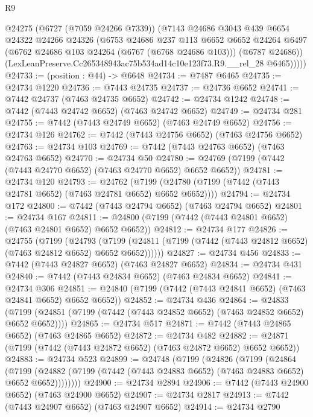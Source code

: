 \begin{lexlean}{R9}
\begin{coremodule}
          @24275
          (@6727 (@7059 @24266 @7339))
          (@7143
            @24686
            @3043
            @439
            @6654
            @24322
            @24266
            @24326
            (@6753
              @24686
              @237
              @113
              @6652
              @6652
              @24264
              @6497
              (@6762 @24686 @103 @24264 (@6767 (@6768 @24686 @103)))
              (@6787 @24686))
            (LexLeanPreserve.Cc265348943ac75b534ad14c10e123f73.R9.__rel_28 @6465)))))
@24733 := (position : @44) -> @6648
@24734 := @7487 @6465
@24735 := @24734 @1220
@24736 := @7443 @24735
@24737 := @24736 @6652
@24741 := @7442 @24737 (@7463 @24735 @6652)
@24742 := @24734 @1242
@24748 := @7442 (@7443 @24742 @6652) (@7463 @24742 @6652)
@24749 := @24734 @281
@24755 := @7442 (@7443 @24749 @6652) (@7463 @24749 @6652)
@24756 := @24734 @126
@24762 := @7442 (@7443 @24756 @6652) (@7463 @24756 @6652)
@24763 := @24734 @103
@24769 := @7442 (@7443 @24763 @6652) (@7463 @24763 @6652)
@24770 := @24734 @50
@24780 := @24769 (@7199 (@7442 (@7443 @24770 @6652) (@7463 @24770 @6652) @6652 @6652))
@24781 := @24734 @120
@24793 := @24762
    (@7199 (@24780 (@7199 (@7442 (@7443 @24781 @6652) (@7463 @24781 @6652) @6652 @6652))))
@24794 := @24734 @172
@24800 := @7442 (@7443 @24794 @6652) (@7463 @24794 @6652)
@24801 := @24734 @167
@24811 := @24800 (@7199 (@7442 (@7443 @24801 @6652) (@7463 @24801 @6652) @6652 @6652))
@24812 := @24734 @177
@24826 := @24755
    (@7199
      (@24793
        (@7199 (@24811 (@7199 (@7442 (@7443 @24812 @6652) (@7463 @24812 @6652) @6652 @6652))))))
@24827 := @24734 @456
@24833 := @7442 (@7443 @24827 @6652) (@7463 @24827 @6652)
@24834 := @24734 @431
@24840 := @7442 (@7443 @24834 @6652) (@7463 @24834 @6652)
@24841 := @24734 @306
@24851 := @24840 (@7199 (@7442 (@7443 @24841 @6652) (@7463 @24841 @6652) @6652 @6652))
@24852 := @24734 @436
@24864 := @24833
    (@7199 (@24851 (@7199 (@7442 (@7443 @24852 @6652) (@7463 @24852 @6652) @6652 @6652))))
@24865 := @24734 @517
@24871 := @7442 (@7443 @24865 @6652) (@7463 @24865 @6652)
@24872 := @24734 @482
@24882 := @24871 (@7199 (@7442 (@7443 @24872 @6652) (@7463 @24872 @6652) @6652 @6652))
@24883 := @24734 @523
@24899 := @24748
    (@7199
      (@24826
        (@7199
          (@24864
            (@7199
              (@24882 (@7199 (@7442 (@7443 @24883 @6652) (@7463 @24883 @6652) @6652 @6652))))))))
@24900 := @24734 @2894
@24906 := @7442 (@7443 @24900 @6652) (@7463 @24900 @6652)
@24907 := @24734 @2817
@24913 := @7442 (@7443 @24907 @6652) (@7463 @24907 @6652)
@24914 := @24734 @2790

\end{coremodule}
\end{lexlean}

